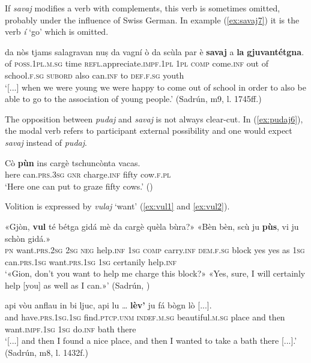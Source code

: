 If \textit{savaj} modifies a verb with complements, this verb is sometimes omitted, probably under the influence of Swiss German. In example (\ref{ex:savaj7}) it is the verb \textit{í} `go' which is omitted.

\ea
\label{ex:savaj7}
	\gll [...] da nòs tjams salagravan nuṣ da vagní ò da scùla par è \textbf{savaj} {\longrule} {a} \textbf{la} \textbf{gjuvantétgna}.\\
 {} of \textsc{ poss.1pl.m.sg} time \textsc{refl}.appreciate.\textsc{impf.1pl} \textsc{1pl} \textsc{comp} come.\textsc{inf} out of school.\textsc{f.sg} \textsc{subord} also can.\textsc{inf} {} to \textsc{def.f.sg} youth\\
\glt `[...] when we were young we were happy to come out of school in order to also be able to go to the association of young people.' (Sadrún, m9, l. 1745ff.)
\z

The opposition between \textit{pudaj} and \textit{savaj} is not always clear-cut. In (\ref{ex:pudaj6}), the modal verb refers to participant external possibility and one would expect \textit{savaj} instead of \textit{pudaj}.

\ea
\label{ex:pudaj6}
\gll   Cò \textbf{pùn} ins cargè tschuncònta vacas.\\
here can.\textsc{prs.3sg} \textsc{gnr} charge.\textsc{inf} fifty cow.\textsc{f.pl}\\
\glt `Here one can put to graze fifty cows.' ()
\z
                               
Volition is expressed by \textit{vulaj} `want' (\ref{ex:vul1} and \ref{ex:vul2}). 

\ea
\label{ex:vul1}
\gll    «Gjòn, \textbf{vul}\footnotemark{} té bétga gidá mè da cargè quèla bùra?» «Bèn bèn, scù ju \textbf{pùs}, vi ju schòn gidá.»\\
\textsc{pn} want.\textsc{prs.2sg} \textsc{2sg} \textsc{neg} help.\textsc{inf} \textsc{1sg} \textsc{comp} carry.\textsc{inf} \textsc{dem.f.sg} block yes yes as \textsc{1sg} can.\textsc{prs.1sg} want.\textsc{prs.1sg} \textsc{1sg} certanily help.\textsc{inf}\\ 
\glt `«Gion, don’t you want to help me charge this block?» «Yes, sure, I will certainly help [you] as well as I can.»' (Sadrún, \citealt[106]{Büchli1966})
\z

\ea
\label{ex:vul2}
\gll  [...] api vòu anflau in bi ljuc, api lu … \textbf{lèv’} ju fá bògn lò [...].\\
{} and have.\textsc{prs.1sg.1sg} find.\textsc{ptcp.unm} \textsc{indef.m.sg} beautiful.\textsc{m.sg} place and then {} want.\textsc{impf.1sg} \textsc{1sg} do.\textsc{inf} bath there\\
\glt `[...] and then I found a nice place, and then I wanted to take a bath there [...].' (Sadrún, m8, l. 1432f.)
\z

